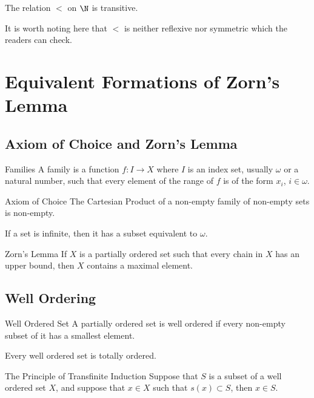\documentclass[a4paper]{article}
\begin{document}
\begin{prp}{}{} The relation $<$ on $\N$ is transitive. 
\end{prp}

It is worth noting here that $<$ is neither reflexive nor symmetric which the readers can check. 

\pagebreak
\section{Equivalent Formations of Zorn's Lemma}
\subsection{Axiom of Choice and Zorn's Lemma}
\begin{defn}{Families}{} A family is a function $f:I\to X$ where $I$ is an index set, usually $\omega$ or a natural number, such that every element of the range of $f$ is of the form $x_i$, $i\in\omega$. 
\end{defn}

\begin{axm}{Axiom of Choice}{} The Cartesian Product of a non-empty family of non-empty sets is non-empty. 
\end{axm}

\begin{thm}{}{} If a set is infinite, then it has a subset equivalent to $\omega$. 
\end{thm}

\begin{thm}{Zorn's Lemma}{} If $X$ is a partially ordered set such that every chain in $X$ has an upper bound, then $X$ contains a maximal element. 
\end{thm}

\subsection{Well Ordering}
\begin{defn}{Well Ordered Set}{} A partially ordered set is well ordered if every non-empty subset of it has a smallest element. 
\end{defn}

\begin{thm}{}{} Every well ordered set is totally ordered. 
\end{thm}

\begin{thm}{The Principle of Transfinite Induction}{} Suppose that $S$ is a subset of a well ordered set $X$, and suppose that $x\in X$ such that $s(x)\subset S$, then $x\in S$. 
\end{thm}
\end{document}
